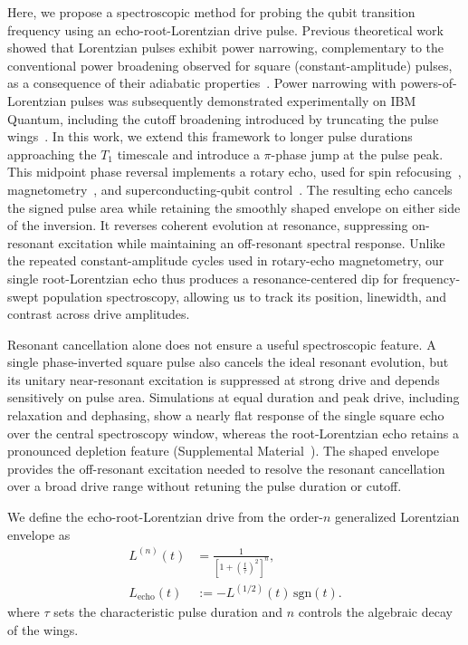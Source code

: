 Here, we propose a spectroscopic method for probing the qubit transition
frequency using an echo-root-Lorentzian drive pulse. Previous theoretical
work showed that Lorentzian pulses exhibit power narrowing, complementary
to the conventional power broadening observed for square (constant-amplitude)
pulses, as a consequence of their adiabatic
properties~\cite{boradjiev_power_2013}. Power narrowing with
powers-of-Lorentzian pulses was subsequently demonstrated experimentally on
IBM Quantum, including the cutoff broadening introduced by truncating the
pulse wings~\cite{mihov_defying_2024}. In this work, we extend this framework
to longer pulse durations approaching the $T_1$ timescale and introduce a
$\pi$-phase jump at the pulse peak. This midpoint phase reversal implements
a rotary echo, used for spin refocusing~\cite{solomon_rotary_echo_1959},
magnetometry~\cite{aiello_composite_pulse_2013}, and superconducting-qubit
control~\cite{gustavsson_rotary_echo_2012}. The resulting echo cancels the
signed pulse area while retaining the smoothly shaped envelope on either
side of the inversion. It reverses coherent evolution at resonance,
suppressing on-resonant excitation while maintaining an off-resonant spectral
response. Unlike the repeated constant-amplitude cycles used in rotary-echo
magnetometry, our single root-Lorentzian echo thus produces a
resonance-centered dip for frequency-swept population spectroscopy, allowing
us to track its position, linewidth, and contrast across drive amplitudes.

Resonant cancellation alone does not ensure a useful spectroscopic feature.
A single phase-inverted square pulse also cancels the ideal resonant evolution,
but its unitary near-resonant excitation is suppressed at strong drive and depends
sensitively on pulse area. Simulations at equal duration and peak drive,
including relaxation and dephasing, show a nearly flat response of the single
square echo over the central spectroscopy window, whereas the root-Lorentzian
echo retains a pronounced depletion feature
(Supplemental Material~\cite{SupplementalMaterial}). The shaped envelope
provides the off-resonant excitation needed to resolve the resonant cancellation
over a broad drive range without retuning the pulse duration or cutoff.

We define the echo-root-Lorentzian drive from the order-$n$ generalized
Lorentzian envelope as
\begin{align}
L^{(n)}(t)
&= \frac{1}{\left[1+\left(\frac{t}{\tau}\right)^2\right]^n},
\\
L_{\mathrm{echo}}(t)
&:= -L^{(1/2)}(t)\,\mathrm{sgn}(t).
\label{eq:Ln}
\end{align}
where $\tau$ sets the characteristic pulse duration and $n$ controls the
algebraic decay of the wings.

